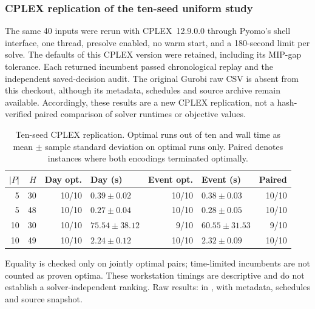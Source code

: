 \subsubsection{CPLEX replication of the ten-seed uniform study}
\label{subsec:cplex_refresh}
The same 40 inputs were rerun with CPLEX~12.9.0.0 through Pyomo's
shell interface, one thread, presolve enabled, no warm start, and a
180-second limit per solve. The defaults of this CPLEX version were
retained, including its MIP-gap tolerance. Each returned incumbent
passed chronological replay and the independent saved-decision audit.
The original Gurobi raw CSV is absent from this checkout, although its
metadata, schedules and source archive remain available. Accordingly,
these results are a new CPLEX replication, not a hash-verified paired
comparison of solver runtimes or objective values.
\begin{table}[t]\centering\small
\caption{Ten-seed CPLEX replication. Optimal runs out of ten and wall
time as mean $\pm$ sample standard deviation on optimal runs only.
Paired denotes instances where both encodings terminated optimally.}
\label{tab:cplex_ten_seed}
\begin{tabular}{rr r l r l r}\toprule
$|P|$ & $H$ & Day opt. & Day (s) & Event opt. & Event (s) & Paired \\\midrule
5 & 30 & 10/10 & $0.39\pm0.02$ & 10/10 & $0.38\pm0.03$ & 10/10 \\
5 & 48 & 10/10 & $0.27\pm0.04$ & 10/10 & $0.28\pm0.05$ & 10/10 \\
10 & 30 & 10/10 & $75.54\pm38.12$ & 9/10 & $60.55\pm31.53$ & 9/10 \\
10 & 49 & 10/10 & $2.24\pm0.12$ & 10/10 & $2.32\pm0.09$ & 10/10 \\
\bottomrule\end{tabular}\end{table}
Equality is checked only on jointly optimal pairs; time-limited
incumbents are not counted as proven optima. These workstation timings
are descriptive and do not establish a solver-independent ranking.
Raw results: 
in , with metadata, schedules and source snapshot.
